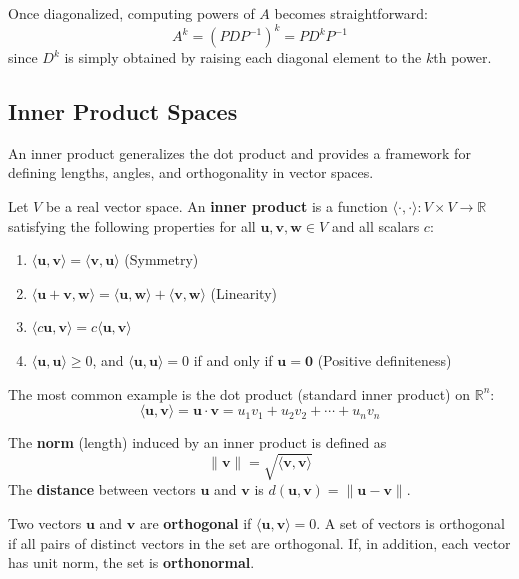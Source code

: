 Once diagonalized, computing powers of $A$ becomes straightforward:
\[
A^k = (PDP^{-1})^k = PD^k P^{-1}
\]
since $D^k$ is simply obtained by raising each diagonal element to the $k$th power.

\subsection{Inner Product Spaces}

An inner product generalizes the dot product and provides a framework for defining lengths, angles, and orthogonality in vector spaces.

\begin{definition}
Let $V$ be a real vector space. An \textbf{inner product} is a function $\langle \cdot, \cdot \rangle: V \times V \to \mathbb{R}$ satisfying the following properties for all $\mathbf{u}, \mathbf{v}, \mathbf{w} \in V$ and all scalars $c$:
\begin{enumerate}
    \item $\langle \mathbf{u}, \mathbf{v} \rangle = \langle \mathbf{v}, \mathbf{u} \rangle$ (Symmetry)
    \item $\langle \mathbf{u} + \mathbf{v}, \mathbf{w} \rangle = \langle \mathbf{u}, \mathbf{w} \rangle + \langle \mathbf{v}, \mathbf{w} \rangle$ (Linearity)
    \item $\langle c\mathbf{u}, \mathbf{v} \rangle = c\langle \mathbf{u}, \mathbf{v} \rangle$
    \item $\langle \mathbf{u}, \mathbf{u} \rangle \ge 0$, and $\langle \mathbf{u}, \mathbf{u} \rangle = 0$ if and only if $\mathbf{u} = \mathbf{0}$ (Positive definiteness)
\end{enumerate}
\end{definition}

The most common example is the dot product (standard inner product) on $\mathbb{R}^n$:
\[
\langle \mathbf{u}, \mathbf{v} \rangle = \mathbf{u} \cdot \mathbf{v} = u_1 v_1 + u_2 v_2 + \cdots + u_n v_n
\]

\begin{definition}
The \textbf{norm} (length) induced by an inner product is defined as
\[
\|\mathbf{v}\| = \sqrt{\langle \mathbf{v}, \mathbf{v} \rangle}
\]
The \textbf{distance} between vectors $\mathbf{u}$ and $\mathbf{v}$ is $d(\mathbf{u}, \mathbf{v}) = \|\mathbf{u} - \mathbf{v}\|$.
\end{definition}

\begin{definition}[Orthogonality]
Two vectors $\mathbf{u}$ and $\mathbf{v}$ are \textbf{orthogonal} if $\langle \mathbf{u}, \mathbf{v} \rangle = 0$. A set of vectors is orthogonal if all pairs of distinct vectors in the set are orthogonal. If, in addition, each vector has unit norm, the set is \textbf{orthonormal}.
\end{definition}

